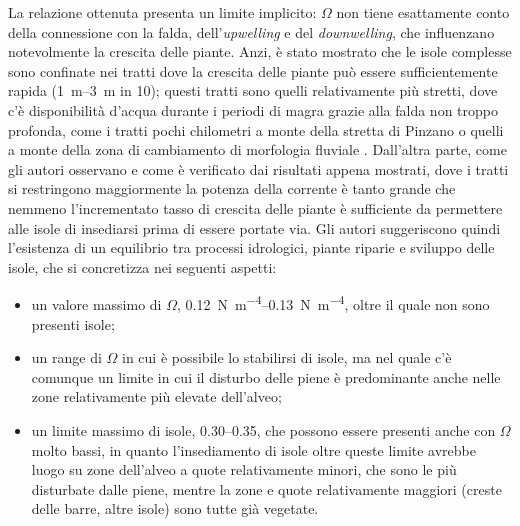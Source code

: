 La relazione ottenuta presenta un limite implicito: $\Omega$ non tiene esattamente conto della connessione con la falda, dell'\emph{upwelling} e del \emph{downwelling}, che influenzano notevolmente la crescita delle piante.
Anzi, è stato mostrato che le isole complesse sono confinate nei tratti dove la crescita delle piante può essere sufficientemente rapida (\SIrange[range-phrase={-}]{1}{3}{\m} in \SI{10}{\anni}); questi tratti sono quelli relativamente più stretti, dove c'è disponibilità d'acqua durante i periodi di magra grazie alla falda non troppo profonda, come i tratti pochi chilometri a monte della stretta di Pinzano o quelli a monte della zona di cambiamento di morfologia fluviale .
Dall'altra parte, come gli autori osservano e come è verificato dai risultati appena mostrati, dove i tratti si restringono maggiormente la potenza della corrente è tanto grande che nemmeno l'incrementato tasso di crescita delle piante è sufficiente da permettere alle isole di insediarsi prima di essere portate via.
Gli autori suggeriscono quindi l'esistenza di un equilibrio tra processi idrologici, piante riparie e sviluppo delle isole, che si concretizza nei seguenti aspetti:
%
\begin{itemize}
	\item un valore massimo di $\Omega$, \SIrange[range-phrase={-}]{0.12}{0.13}{\newton\per\metre\tothe{4}}, oltre il quale non sono presenti isole;
	\item un range di $\Omega$ in cui è possibile lo stabilirsi di isole, ma nel quale c'è comunque un limite in cui il disturbo delle piene è predominante anche nelle zone relativamente più elevate dell'alveo;
	\item un limite massimo di isole, \numrange[range-phrase={-}]{0.30}{0.35}, che possono essere presenti anche con $\Omega$ molto bassi, in quanto l'insediamento di isole oltre queste limite avrebbe luogo su zone dell'alveo a quote relativamente minori, che sono le più disturbate dalle piene, mentre la zone e quote relativamente maggiori (creste delle barre, altre isole) sono tutte già vegetate.
\end{itemize}